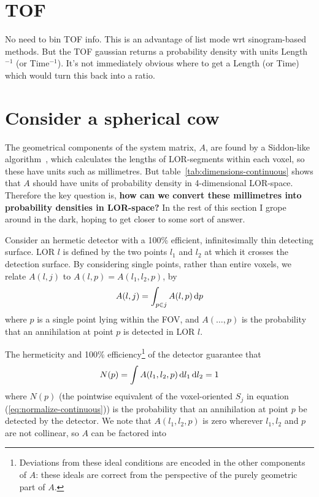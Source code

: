 \documentclass[10pt, a4paper, twocolumn]{article} %
\newcommand\dd[1]  { \,\textrm d{#1} }   %
\begin{document}

\section{TOF}\label{sec:tof}

No need to bin TOF info. This is an advantage of list mode wrt sinogram-based
methods. But the TOF gaussian returns a probability density with units
Length\(^{-1}\) (or Time\(^{-1}\)). It's not immediately obvious where to get a
Length (or Time) which would turn this back into a ratio.


\section{Consider a spherical cow}\label{sec:spherical-cow}

The geometrical components of the system matrix, \(A\), are found by a
Siddon-like algorithm~\citep{Siddon}, which calculates the lengths of
LOR-segments within each voxel, so these have units such as millimetres. But
table~\ref{tab:dimensions-continuous} shows that \(A\) should have units of
probability density in 4-dimensional LOR-space. Therefore the key question is,
\textbf{how can we convert these millimetres into probability densities in
  LOR-space?} In the rest of this section I grope around in the dark, hoping to
get closer to some sort of answer.

Consider an hermetic detector with a 100\% efficient, infinitesimally thin
detecting surface. LOR \(l\) is defined by the two points \(l_{1}\) and
\(l_{2}\) at which it crosses the detection surface. By considering single
points, rather than entire voxels, we relate \(A(l,j)\) to
\(A(l,p) = A(l_{1}, l_{2}, p)\), by
\begin{equation}
  A(l,j) = \int_{p\in j}A(l, p)\dd p\label{eq:A-voxel-point}
\end{equation}
where \(p\) is a single point lying
within the FOV\@, and \(A(\ldots, p)\) is the probability that an annihilation
at point \(p\) is detected in LOR \(l\).

The hermeticity and 100\% efficiency\footnote{Deviations from these ideal
  conditions are encoded in the other components of \(A\): these ideals are
  correct from the perspective of the purely geometric part of \(A\).} of the
detector guarantee that
\[N(p) = \int A(l_{1}, l_{2}, p) \dd l_{1}\dd l_{2} = 1\] where \(N(p)\) (the
pointwise equivalent of the voxel-oriented \(S_{j}\) in equation
(\ref{eq:normalize-continuous})) is the probability that an annihilation at
point \(p\) be detected by the detector. We note that \(A(l_{1}, l_{2}, p)\) is
zero wherever \(l_{1}, l_{2}\) and \(p\) are not collinear, so \(A\) can be
factored into
\end{document}
